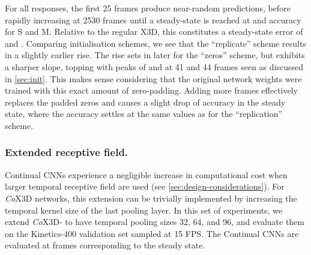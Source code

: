\documentclass[runningheads]{llncs}
\begin{document}
For all responses, the first 25 frames produce near-random predictions, before rapidly increasing at 2530 frames until a steady-state is reached at  and  accuracy for S and M.
Relative to the regular X3D, this constitutes a steady-state error of  and .
Comparing initialisation schemes, we see that the ``replicate'' scheme results in a slightly earlier rise. The rise sets in later for the ``zeros'' scheme, but exhibits a sharper slope, topping with peaks of  and  at 41 and 44 frames seen as discussed in \cref{sec:init}.
This makes sense considering that the original network weights were trained with this exact amount of zero-padding. Adding more frames effectively replaces the padded zeros and causes a slight drop of accuracy in the steady state, where the accuracy settles at the same values as for the ``replication'' scheme. 



\vspace{-3mm}
\subsubsection{Extended receptive field.} \label{sec:exp-extended-receptive-fields}
Continual CNNs experience a negligible increase in computational cost when larger temporal receptive field are used (see \cref{sec:design-considerations}). 
For \textit{Co}X3D networks, this extension can be trivially implemented by increasing the temporal kernel size of the last pooling layer.
In this set of experiments, we extend \textit{Co}X3D- to have temporal pooling sizes 32, 64, and 96, and evaluate them on the Kinetics-400 validation set sampled at 15 FPS.
The Continual CNNs are evaluated at frames corresponding to the steady state.
\end{document}
